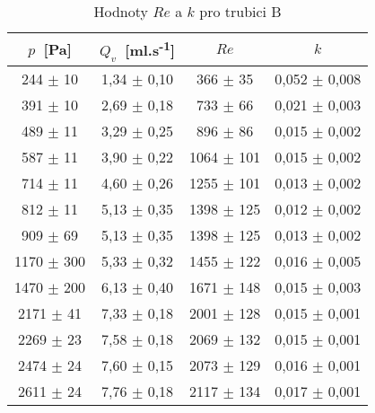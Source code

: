 \begin{table}[htbp]
\centering
\begin{tabular}{|cccc|}
\hline 
$p$~[Pa]  &  $Q_v$~[ml.s\textsuperscript{-1}]  & $Re$ & $k$ \\ \hline
 244 $\pm$ 10 & 1,34 $\pm$ 0,10 & 366 $\pm$ 35 & 0,052 $\pm$ 0,008\\ 
 391 $\pm$ 10 & 2,69 $\pm$ 0,18 & 733 $\pm$ 66 & 0,021 $\pm$ 0,003\\ 
 489 $\pm$ 11 & 3,29 $\pm$ 0,25 & 896 $\pm$ 86 & 0,015 $\pm$ 0,002\\ 
 587 $\pm$ 11 & 3,90 $\pm$ 0,22 & 1064 $\pm$ 101 & 0,015 $\pm$ 0,002\\ 
 714 $\pm$ 11 & 4,60 $\pm$ 0,26 & 1255 $\pm$ 101 & 0,013 $\pm$ 0,002\\ 
 812 $\pm$ 11 & 5,13 $\pm$ 0,35 & 1398 $\pm$ 125 & 0,012 $\pm$ 0,002\\ 
 909 $\pm$ 69 & 5,13 $\pm$ 0,35 & 1398 $\pm$ 125 & 0,013 $\pm$ 0,002\\ 
 1170 $\pm$ 300 & 5,33 $\pm$ 0,32 & 1455 $\pm$ 122 & 0,016 $\pm$ 0,005\\ 
 1470 $\pm$ 200 & 6,13 $\pm$ 0,40 & 1671 $\pm$ 148 & 0,015 $\pm$ 0,003\\ 
 2171 $\pm$ 41 & 7,33 $\pm$ 0,18 & 2001 $\pm$ 128 & 0,015 $\pm$ 0,001 \\ 
 2269 $\pm$ 23 & 7,58 $\pm$ 0,18 & 2069 $\pm$ 132 & 0,015 $\pm$ 0,001 \\ 
 2474 $\pm$ 24 & 7,60 $\pm$ 0,15 & 2073 $\pm$ 129 & 0,016 $\pm$ 0,001 \\ 
 2611 $\pm$ 24 & 7,76 $\pm$ 0,18 & 2117 $\pm$ 134 & 0,017 $\pm$ 0,001 \\ 
\hline
\end{tabular}
\caption{Hodnoty $Re$ a $k$ pro trubici B}
\label{tab:kReB}
\end{table}

